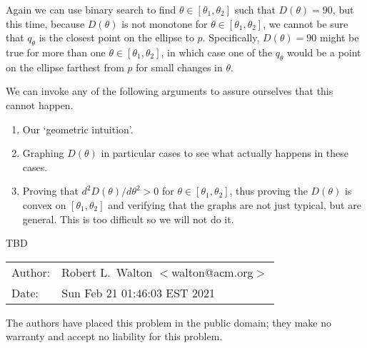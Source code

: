 \documentclass[12pt]{article}
\begin{document}
Again we can use binary search to find
$\theta \in [\theta_1,\theta_2]$ such that
$D(\theta) = 90$, but this time, because $D(\theta)$ is not
monotone for $\theta \in [\theta_1,\theta_2]$, we cannot
be sure that $q_\theta$ is the closest
point on the ellipse to $p$.  Specifically,
$D(\theta) = 90$ might be true for more than one
$\theta \in [\theta_1,\theta_2]$, in which case one of the
$q_\theta$ would be a point on the ellipse farthest from
$p$ for small changes in $\theta$.

We can invoke any of the following arguments to assure
ourselves that this cannot happen.

\begin{enumerate}
\item Our `geometric intuition'.
\item Graphing $D(\theta)$ in particular cases to see what
actually happens in these cases.
\item Proving that $d^2 D(\theta)/d\theta^2 > 0$ for
$\theta \in [\theta_1,\theta_2]$, thus proving the $D(\theta)$
is convex on $[\theta_1,\theta_2]$ and verifying that the graphs
are not just typical, but are general.  This is too difficult
so we will not do it.
\end{enumerate}

TBD





\bigskip

\begin{tabular}{ll}
Author:	      & Robert L.~Walton $<$walton@acm.org$>$ \\
Date:         & Sun Feb 21 01:46:03 EST 2021

\end{tabular}

The authors have placed this problem in the public domain;
they make no warranty and accept no liability for this problem.
\end{document}
